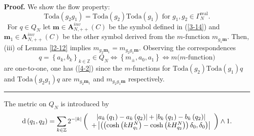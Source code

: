 \documentclass[a4paper]{article}%
\newenvironment{proof}[1][Proof]{\noindent\textbf{#1.} }{\ \rule{0.5em}{0.5em}}
\begin{document}
\begin{proof}
We show the flow property:%
\begin{equation}
\mathrm{Toda}\left(  g_{2}g_{1}\right)  =\mathrm{Toda}\left(  g_{2}\right)
\mathrm{Toda}\left(  g_{1}\right)  \text{ \ for }g_{1},g_{2}\in\Gamma
_{N}^{\operatorname{real}}\text{.} \label{4-2}%
\end{equation}
\ For $q\in Q_{N}$ let $\boldsymbol{m}\in\boldsymbol{A}_{N,++}^{inv}\left(
C\right)  $ be the symbol defined in (\ref{3-14}) and $\boldsymbol{m}_{1}%
\in\boldsymbol{A}_{N,++}^{inv}\left(  C\right)  $ be the other symbol derived
from the $m$-function $m_{g_{1}\boldsymbol{m}}$. Then, (iii) of Lemma
\ref{l2-12} implies $m_{g_{2}\boldsymbol{m}_{1}}=m_{g_{2}g_{1}\boldsymbol{m}}%
$. Observing the correspondences
\[
q=\left\{  a_{k},b_{k}\right\}  _{k\in\mathbb{Z}}\in Q_{N}\Longleftrightarrow
\left\{  m_{\pm},a_{0},a_{1}\right\}  \Longleftrightarrow m\text{
(}m\text{-function)}%
\]
are one-to-one, one has (\ref{4-2}) since the $m$-functions for $\mathrm{Toda}%
\left(  g_{2}\right)  \mathrm{Toda}\left(  g_{1}\right)  q$ and $\mathrm{Toda}%
\left(  g_{2}g_{1}\right)  q$ are $m_{g_{2}\boldsymbol{m}_{1}}$ and
$m_{g_{2}g_{1}\boldsymbol{m}}$ respectively.\bigskip
\end{proof}

The metric on $Q_{N}$ is introduced by
\[
\mathrm{d}\left(  q_{1},q_{2}\right)  =\sum_{k\in\mathbb{Z}}2^{-\left\vert
k\right\vert }\left(
\begin{array}
[c]{c}%
\left\vert a_{k}\left(  q_{1}\right)  -a_{k}\left(  q_{2}\right)  \right\vert
+\left\vert b_{k}\left(  q_{1}\right)  -b_{k}\left(  q_{2}\right)  \right\vert
\\
+\left\vert \left(  \left(  \cosh\left(  kH_{q_{1}}^{N}\right)  -\cosh\left(
kH_{q_{2}}^{N}\right)  \right)  \delta_{0},\delta_{0}\right)  \right\vert
\end{array}
\right)  \wedge1\text{.}%
\]
\end{document}
